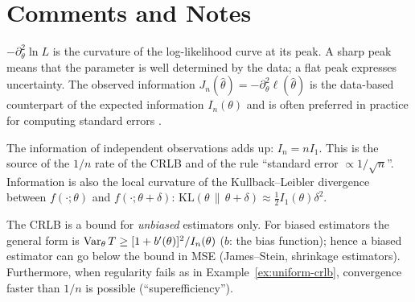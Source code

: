 \documentclass[main.tex]{subfiles}
\begin{document}
\section{Comments and Notes}

\begin{remark}
$-\partial^2_\theta\ln L$ is the curvature of the log-likelihood curve at its peak. A sharp peak means that the parameter is well determined by the data; a flat peak expresses uncertainty. The observed information $J_n(\hat\theta)=-\partial^2_\theta\ell(\hat\theta)$ is the data-based counterpart of the expected information $I_n(\theta)$ and is often preferred in practice for computing standard errors \cite{efron-hinkley78}.
\end{remark}

\begin{remark}
The information of independent observations adds up: $I_n=nI_1$. This is the source of the $1/n$ rate of the CRLB and of the rule ``standard error $\propto1/\sqrt n$''. Information is also the local curvature of the Kullback--Leibler divergence between $f(\cdot;\theta)$ and $f(\cdot;\theta+\delta)$: $\mathrm{KL}(\theta\,\|\,\theta+\delta)\approx\frac12I_1(\theta)\delta^2$.
\end{remark}

\begin{remark}
The CRLB is a bound for \emph{unbiased} estimators only. For biased estimators the general form is $\operatorname{Var}_\theta T\ge[1+b'(\theta)]^2/I_n(\theta)$ ($b$: the bias function); hence a biased estimator can go below the bound in MSE (James--Stein, shrinkage estimators). Furthermore, when regularity fails as in Example~\ref{ex:uniform-crlb}, convergence faster than $1/n$ is possible (``superefficiency'').
\end{remark}

\end{document}

